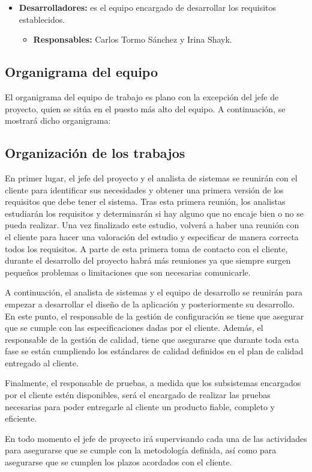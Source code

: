 \begin{itemize}
\item \textbf{Desarrolladores:} es el equipo encargado de desarrollar los requisitos establecidos.
  \begin{itemize}
  \item \textbf{Responsables:} Carlos Tormo Sánchez y Irina Shayk.
  \end{itemize}
\end{itemize}

\subsection {Organigrama del equipo}
\par El organigrama del equipo de trabajo es plano con la excepción del jefe de proyecto, quien se sitúa en el puesto más alto del equipo. A continuación, se mostrará dicho organigrama:

\subsection {Organización de los trabajos}
\par En primer lugar, el jefe del proyecto y el analista de sistemas se reunirán con el cliente para identificar sus necesidades y obtener una primera versión de los requisitos que debe tener el sistema. Tras esta primera reunión, los analistas estudiarán los requisitos y determinarán si hay alguno que no encaje bien o no se pueda realizar. Una vez finalizado este estudio, volverá a haber una reunión con el cliente para hacer una valoración del estudio y especificar de manera correcta todos los requisitos. A parte de esta primera toma de contacto con el cliente, durante el desarrollo del proyecto habrá más reuniones ya que siempre surgen pequeños problemas o limitaciones que son necesarias comunicarle.
\par A continuación, el analista de sistemas y el equipo de desarrollo se reunirán para empezar a desarrollar el diseño de la aplicación y posteriormente su desarrollo. En este punto, el responsable de la gestión de configuración se tiene que asegurar que se cumple con las especificaciones dadas por el cliente. Además, el responsable de la gestión de calidad, tiene que asegurarse que durante toda esta fase se están cumpliendo los estándares de calidad definidos en el plan de calidad entregado al cliente.
\par Finalmente, el responsable de pruebas, a medida que los subsistemas encargados por el cliente estén disponibles, será el encargado de realizar las pruebas necesarias para poder entregarle al cliente un producto fiable, completo y eficiente.
\par En todo momento el jefe de proyecto irá supervisando cada una de las actividades para asegurarse que se cumple con la metodología definida, así como para asegurarse que se cumplen los plazos acordados con el cliente.
